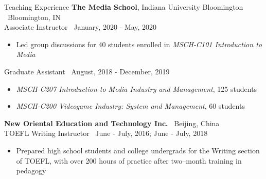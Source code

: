 \documentclass{resume}
\begin{document}
\begin{rSection}{Teaching Experience}
{\bf The Media School}{, Indiana University Bloomington} \hfill {\ {Bloomington, IN}}\\
Associate Instructor \hfill {\ January, 2020 - May, 2020}
\begin{itemize}
  \item \vspace{-0.5em} Led group discussions for 40 students enrolled in \textit {MSCH-C101 Introduction to Media} \vspace{-0.3em}
\end{itemize} 


Graduate Assistant \hfill {\ August, 2018 - December, 2019}
\begin{itemize}
  \item \vspace{-0.5em}  \textit{MSCH-C207 Introduction to Media Industry and Management}, 125 students
  \item \vspace{-0.5em}  \textit{MSCH-C200 Videogame Industry: System and Management}, 60 students
\end{itemize}

{\bf New Oriental Education and Technology Inc.}{} \hfill {\ {Beijing, China}}\\
TOEFL Writing Instructor \hfill {\ June - July, 2016; June - July, 2018} 

\begin{itemize}
  \item \vspace{-0.5em}  Prepared high school students and college undergrads for the Writing section of TOEFL, with over 200 hours of practice after two--month training in pedagogy
\end{itemize}

\end{rSection}

\end{document}
